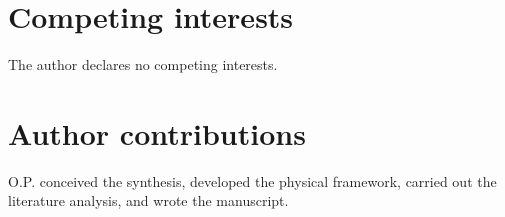 \documentclass[11pt]{article}
\begin{document}
\section*{Competing interests}
The author declares no competing interests.

\section*{Author contributions}
O.P. conceived the synthesis, developed the physical framework, carried out the literature analysis, and wrote the manuscript.


\scriptsize
\renewcommand{\baselinestretch}{0.92}\selectfont
\setlength{\bibsep}{0pt}

\end{document}
